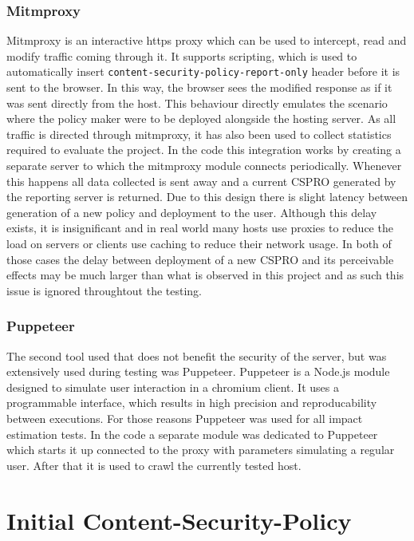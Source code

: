 \begin{description}
\subsubsection{Mitmproxy}
Mitmproxy is an interactive https proxy which can be used to intercept, read and modify traffic coming through it.
It supports scripting, which is used to automatically insert \texttt{content-security-policy-report-only} header before it is sent to the browser.
In this way, the browser sees the modified response as if it was sent directly from the host.
This behaviour directly emulates the scenario where the policy maker were to be deployed alongside the hosting server.
As all traffic is directed through mitmproxy, it has also been used to collect statistics required to evaluate the project.
In the code this integration works by creating a separate server to which the mitmproxy module connects periodically.
Whenever this happens all data collected is sent away and a current CSPRO generated by the reporting server is returned.
Due to this design there is slight latency between generation of a new policy and deployment to the user.
Although this delay exists, it is insignificant and in real world many hosts use proxies to reduce the load on servers or clients use caching to reduce their network usage.
In both of those cases the delay between deployment of a new CSPRO and its perceivable effects may be much larger than what is observed in this project and as such this issue is ignored throughtout the testing.


\subsubsection{Puppeteer}
The second tool used that does not benefit the security of the server, but was extensively used during testing was Puppeteer.
Puppeteer is a Node.js module designed to simulate user interaction in a chromium client.
It uses a programmable interface, which results in high precision and reproducability between executions.
For those reasons Puppeteer was used for all impact estimation tests.
In the code a separate module was dedicated to Puppeteer which starts it up connected to the proxy with parameters simulating a regular user.
After that it is used to crawl the currently tested host.


\section{Initial Content-Security-Policy}


\end{description}
